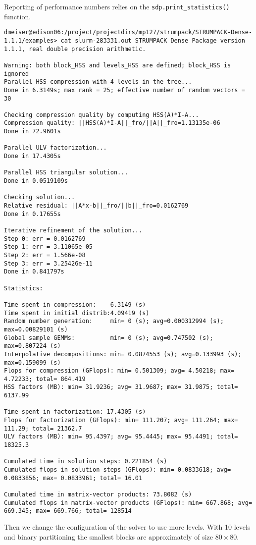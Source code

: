 \documentclass{acmsmall}
\begin{document}
Reporting of performance numbers relies on the
\verb!sdp.print_statistics()! function.
\begin{verbatim}
dmeiser@edison06:/project/projectdirs/mp127/strumpack/STRUMPACK-Dense-1.1.1/examples> cat slurm-283331.out STRUMPACK Dense Package version 1.1.1, real double precision arithmetic.

Warning: both block_HSS and levels_HSS are defined; block_HSS is ignored
Parallel HSS compression with 4 levels in the tree...
Done in 6.3149s; max rank = 25; effective number of random vectors = 30

Checking compression quality by computing HSS(A)*I-A...
Compression quality: ||HSS(A)*I-A||_fro/||A||_fro=1.13135e-06
Done in 72.9601s

Parallel ULV factorization...
Done in 17.4305s

Parallel HSS triangular solution...
Done in 0.0519109s

Checking solution...
Relative residual: ||A*x-b||_fro/||b||_fro=0.0162769
Done in 0.17655s

Iterative refinement of the solution...
Step 0: err = 0.0162769
Step 1: err = 3.11065e-05
Step 2: err = 1.566e-08
Step 3: err = 3.25426e-11
Done in 0.841797s

Statistics: 

Time spent in compression:    6.3149 (s)
Time spent in initial distrib:4.09419 (s)
Random number generation:     min= 0 (s); avg=0.000312994 (s); max=0.00829101 (s)
Global sample GEMMs:          min= 0 (s); avg=0.747502 (s); max=0.807224 (s)
Interpolative decompositions: min= 0.0874553 (s); avg=0.133993 (s); max=0.159099 (s)
Flops for compression (GFlops): min= 0.501309; avg= 4.50218; max= 4.72233; total= 864.419
HSS factors (MB): min= 31.9236; avg= 31.9687; max= 31.9875; total= 6137.99

Time spent in factorization: 17.4305 (s)
Flops for factorization (GFlops): min= 111.207; avg= 111.264; max= 111.29; total= 21362.7
ULV factors (MB): min= 95.4397; avg= 95.4445; max= 95.4491; total= 18325.3

Cumulated time in solution steps: 0.221854 (s)
Cumulated flops in solution steps (GFlops): min= 0.0833618; avg= 0.0833856; max= 0.0833961; total= 16.01

Cumulated time in matrix-vector products: 73.8082 (s)
Cumulated flops in matrix-vector products (GFlops): min= 667.868; avg= 669.345; max= 669.766; total= 128514
\end{verbatim}

Then we change the configuration of the solver to use more
levels.  With 10 levels and binary partitioning the smallest
blocks are approximately of size $80\times 80$.
\end{document}
